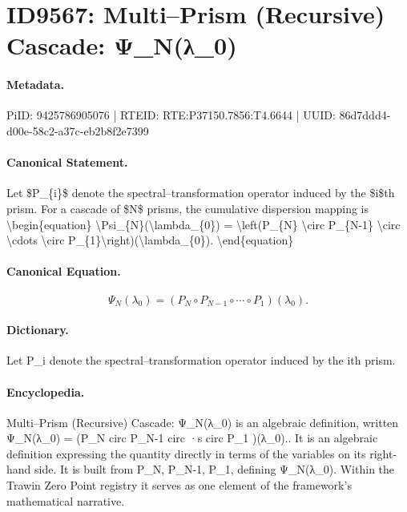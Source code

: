 \section*{ID9567: Multi–Prism (Recursive) Cascade: Ψ\_N(λ\_0)}
\paragraph{Metadata.}
PiID: 9425786905076 | RTEID: RTE:P37150.7856:T4.6644 | UUID: 86d7ddd4-d00e-58c2-a37c-eb2b8f2e7399

\paragraph{Canonical Statement.}
Let \$P\_\{i\}\$ denote the spectral–transformation operator induced by the \$i\$th prism. For a cascade of \$N\$ prisms, the cumulative dispersion mapping is \textbackslash{}begin\{equation\} \textbackslash{}Psi\_\{N\}(\textbackslash{}lambda\_\{0\}) = \textbackslash{}left(P\_\{N\} \textbackslash{}circ P\_\{N-1\} \textbackslash{}circ \textbackslash{}cdots \textbackslash{}circ P\_\{1\}\textbackslash{}right)(\textbackslash{}lambda\_\{0\}). \textbackslash{}end\{equation\}

\paragraph{Canonical Equation.}
\[
\Psi_{N}(\lambda_{0}) = \left(P_{N} \circ P_{N-1} \circ \cdots \circ P_{1}\right)(\lambda_{0}).
\]

\paragraph{Dictionary.}
Let P\_i denote the spectral–transformation operator induced by the ith prism.

\paragraph{Encyclopedia.}
Multi–Prism (Recursive) Cascade: Ψ\_N(λ\_0) is an algebraic definition, written Ψ\_N(λ\_0) = (P\_N circ P\_N-1 circ ·s circ P\_1 )(λ\_0).. It is an algebraic definition expressing the quantity directly in terms of the variables on its right-hand side. It is built from P\_N, P\_N-1, P\_1, defining Ψ\_N(λ\_0). Within the Trawin Zero Point registry it serves as one element of the framework's mathematical narrative.
